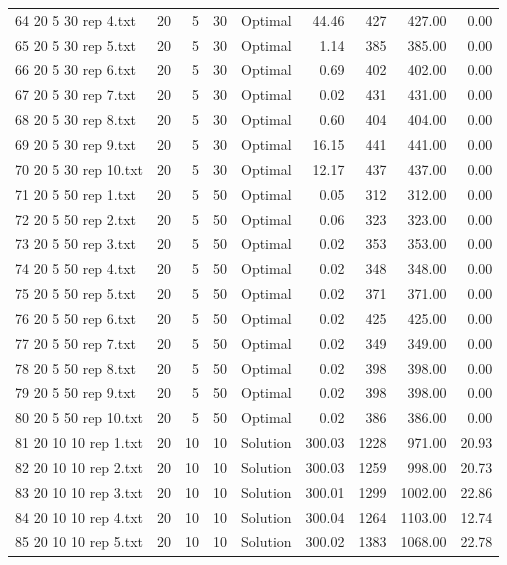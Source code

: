 \begin{longtable}{lrrllrrrr}
64 20 5 30 rep 4.txt & 20 & 5 & 30 & Optimal & 44.46 & 427 & 427.00 &  0.00\\
65 20 5 30 rep 5.txt & 20 & 5 & 30 & Optimal &  1.14 & 385 & 385.00 &  0.00\\
66 20 5 30 rep 6.txt & 20 & 5 & 30 & Optimal &  0.69 & 402 & 402.00 &  0.00\\
67 20 5 30 rep 7.txt & 20 & 5 & 30 & Optimal &  0.02 & 431 & 431.00 &  0.00\\
68 20 5 30 rep 8.txt & 20 & 5 & 30 & Optimal &  0.60 & 404 & 404.00 &  0.00\\
69 20 5 30 rep 9.txt & 20 & 5 & 30 & Optimal & 16.15 & 441 & 441.00 &  0.00\\
70 20 5 30 rep 10.txt & 20 & 5 & 30 & Optimal & 12.17 & 437 & 437.00 &  0.00\\
71 20 5 50 rep 1.txt & 20 & 5 & 50 & Optimal &  0.05 & 312 & 312.00 &  0.00\\
72 20 5 50 rep 2.txt & 20 & 5 & 50 & Optimal &  0.06 & 323 & 323.00 &  0.00\\
73 20 5 50 rep 3.txt & 20 & 5 & 50 & Optimal &  0.02 & 353 & 353.00 &  0.00\\
74 20 5 50 rep 4.txt & 20 & 5 & 50 & Optimal &  0.02 & 348 & 348.00 &  0.00\\
75 20 5 50 rep 5.txt & 20 & 5 & 50 & Optimal &  0.02 & 371 & 371.00 &  0.00\\
76 20 5 50 rep 6.txt & 20 & 5 & 50 & Optimal &  0.02 & 425 & 425.00 &  0.00\\
77 20 5 50 rep 7.txt & 20 & 5 & 50 & Optimal &  0.02 & 349 & 349.00 &  0.00\\
78 20 5 50 rep 8.txt & 20 & 5 & 50 & Optimal &  0.02 & 398 & 398.00 &  0.00\\
79 20 5 50 rep 9.txt & 20 & 5 & 50 & Optimal &  0.02 & 398 & 398.00 &  0.00\\
80 20 5 50 rep 10.txt & 20 & 5 & 50 & Optimal &  0.02 & 386 & 386.00 &  0.00\\
81 20 10 10 rep 1.txt & 20 & 10 & 10 & Solution & 300.03 & 1228 & 971.00 & 20.93\\
82 20 10 10 rep 2.txt & 20 & 10 & 10 & Solution & 300.03 & 1259 & 998.00 & 20.73\\
83 20 10 10 rep 3.txt & 20 & 10 & 10 & Solution & 300.01 & 1299 & 1002.00 & 22.86\\
84 20 10 10 rep 4.txt & 20 & 10 & 10 & Solution & 300.04 & 1264 & 1103.00 & 12.74\\
85 20 10 10 rep 5.txt & 20 & 10 & 10 & Solution & 300.02 & 1383 & 1068.00 & 22.78\\

\end{longtable}
